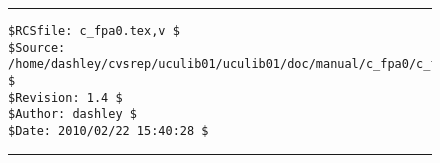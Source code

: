 \noindent\begin{figure}[!b]
\noindent\rule[-0.25in]{\textwidth}{1pt}
\begin{tiny}
\begin{verbatim}
$RCSfile: c_fpa0.tex,v $
$Source: /home/dashley/cvsrep/uculib01/uculib01/doc/manual/c_fpa0/c_fpa0.tex,v $
$Revision: 1.4 $
$Author: dashley $
$Date: 2010/02/22 15:40:28 $
\end{verbatim}
\end{tiny}
\noindent\rule[0.25in]{\textwidth}{1pt}
\end{figure}

%
%
%
%

